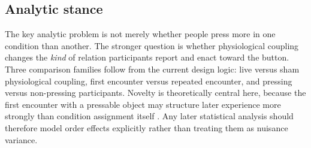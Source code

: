 \subsection{Analytic stance}

The key analytic problem is not merely whether people press more in one condition than another. The stronger question is whether physiological coupling changes the \emph{kind} of relation participants report and enact toward the button. Three comparison families follow from the current design logic: live versus sham physiological coupling, first encounter versus repeated encounter, and pressing versus non-pressing participants. Novelty is theoretically central here, because the first encounter with a pressable object may structure later experience more strongly than condition assignment itself \citep{KiddHayden2015,RanganathRainer2003}. Any later statistical analysis should therefore model order effects explicitly rather than treating them as nuisance variance.
